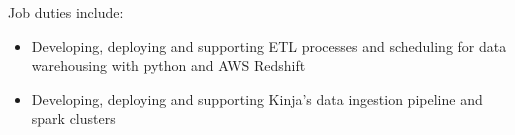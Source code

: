 \normalsize
Job duties include:
\small
\begin{itemize}
    \item Developing, deploying and supporting ETL processes and scheduling for data warehousing with python and AWS Redshift
    \item Developing, deploying and supporting Kinja's data ingestion pipeline and spark clusters
\end{itemize}
\normalsize
\medskip
